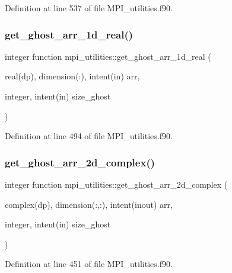 Definition at line 537 of file M\+P\+I\+\_\+utilities.\+f90.

\mbox{\label{namespacempi__utilities_a298564f1d8c0e8720419a10dca24587a}} 
\subsubsection{\texorpdfstring{get\+\_\+ghost\+\_\+arr\+\_\+1d\+\_\+real()}{get\_ghost\_arr\_1d\_real()}}
{\footnotesize\ttfamily integer function mpi\+\_\+utilities\+::get\+\_\+ghost\+\_\+arr\+\_\+1d\+\_\+real (\begin{DoxyParamCaption}\item[{real(dp), dimension(\+:), intent(in)}]{arr,  }\item[{integer, intent(in)}]{size\+\_\+ghost }\end{DoxyParamCaption})}



Definition at line 494 of file M\+P\+I\+\_\+utilities.\+f90.

\mbox{\label{namespacempi__utilities_a84112225ce7bf0b3f893b23512be58df}} 
\subsubsection{\texorpdfstring{get\+\_\+ghost\+\_\+arr\+\_\+2d\+\_\+complex()}{get\_ghost\_arr\_2d\_complex()}}
{\footnotesize\ttfamily integer function mpi\+\_\+utilities\+::get\+\_\+ghost\+\_\+arr\+\_\+2d\+\_\+complex (\begin{DoxyParamCaption}\item[{complex(dp), dimension(\+:,\+:), intent(inout)}]{arr,  }\item[{integer, intent(in)}]{size\+\_\+ghost }\end{DoxyParamCaption})}



Definition at line 451 of file M\+P\+I\+\_\+utilities.\+f90.

